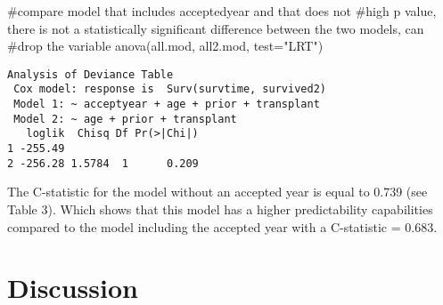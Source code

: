 \documentclass[
  letterpaper,
  DIV=11,
  numbers=noendperiod]{scrreprt}
\newenvironment{Shaded}{\begin{snugshade}}{\end{snugshade}}
\newcommand{\AttributeTok}[1]{\textcolor[rgb]{0.40,0.45,0.13}{#1}}
\newcommand{\CommentTok}[1]{\textcolor[rgb]{0.37,0.37,0.37}{#1}}
\newcommand{\FunctionTok}[1]{\textcolor[rgb]{0.28,0.35,0.67}{#1}}
\newcommand{\NormalTok}[1]{\textcolor[rgb]{0.00,0.23,0.31}{#1}}
\newcommand{\StringTok}[1]{\textcolor[rgb]{0.13,0.47,0.30}{#1}}
\begin{document}
\begin{Shaded}
\begin{Highlighting}[]
\CommentTok{\#compare model that includes acceptedyear and that does not}
\CommentTok{\#high p value, there is not a statistically significant difference between the two models, can}
\CommentTok{\#drop the variable}
\FunctionTok{anova}\NormalTok{(all.mod, all2.mod, }\AttributeTok{test=}\StringTok{"LRT"}\NormalTok{)}
\end{Highlighting}
\end{Shaded}

\begin{verbatim}
Analysis of Deviance Table
 Cox model: response is  Surv(survtime, survived2)
 Model 1: ~ acceptyear + age + prior + transplant
 Model 2: ~ age + prior + transplant
   loglik  Chisq Df Pr(>|Chi|)
1 -255.49                     
2 -256.28 1.5784  1      0.209
\end{verbatim}

The C-statistic for the model without an accepted year is equal to 0.739
(see Table 3). Which shows that this model has a higher predictability
capabilities compared to the model including the accepted year with a
C-statistic = 0.683.

\hypertarget{discussion}{%
\chapter{Discussion}\label{discussion}}
\end{document}

